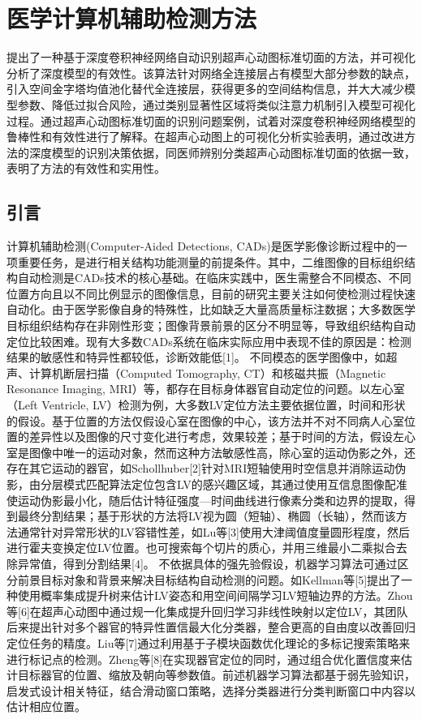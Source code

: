 \chapter{医学计算机辅助检测方法}
\label{chap:Detection}

 提出了一种基于深度卷积神经网络自动识别超声心动图标准切面的方法，并可视化分析了深度模型的有效性。该算法针对网络全连接层占有模型大部分参数的缺点，引入空间金字塔均值池化替代全连接层，获得更多的空间结构信息，并大大减少模型参数、降低过拟合风险，通过类别显著性区域将类似注意力机制引入模型可视化过程。通过超声心动图标准切面的识别问题案例，试着对深度卷积神经网络模型的鲁棒性和有效性进行了解释。在超声心动图上的可视化分析实验表明，通过改进方法的深度模型的识别决策依据，同医师辨别分类超声心动图标准切面的依据一致，表明了方法的有效性和实用性。

\section{引言}
计算机辅助检测(Computer-Aided Detections, CADs)是医学影像诊断过程中的一项重要任务，是进行相关结构功能测量的前提条件。其中，二维图像的目标组织结构自动检测是CADs技术的核心基础。在临床实践中，医生需整合不同模态、不同位置方向且以不同比例显示的图像信息，目前的研究主要关注如何使检测过程快速自动化。由于医学影像自身的特殊性，比如缺乏大量高质量标注数据；大多数医学目标组织结构存在非刚性形变；图像背景前景的区分不明显等，导致组织结构自动定位比较困难。现有大多数CADs系统在临床实际应用中表现不佳的原因是：检测结果的敏感性和特异性都较低，诊断效能低[1]。
不同模态的医学图像中，如超声、计算机断层扫描（Computed Tomography, CT）和核磁共振（Magnetic Resonance Imaging, MRI）等，都存在目标身体器官自动定位的问题。以左心室（Left Ventricle, LV）检测为例，大多数LV定位方法主要依据位置，时间和形状的假设。基于位置的方法仅假设心室在图像的中心，该方法并不对不同病人心室位置的差异性以及图像的尺寸变化进行考虑，效果较差；基于时间的方法，假设左心室是图像中唯一的运动对象，然而这种方法敏感性高，除心室的运动伪影之外，还存在其它运动的器官，如Schollhuber[2]针对MRI短轴使用时空信息并消除运动伪影，由分层模式匹配算法定位包含LV的感兴趣区域，其通过使用互信息图像配准使运动伪影最小化，随后估计特征强度—时间曲线进行像素分类和边界的提取，得到最终分割结果；基于形状的方法将LV视为圆（短轴）、椭圆（长轴），然而该方法通常针对异常形状的LV容错性差，如Lu等[3]使用大津阈值度量圆形程度，然后进行霍夫变换定位LV位置。也可搜索每个切片的质心，并用三维最小二乘拟合去除异常值，得到分割结果[4]。
不依据具体的强先验假设，机器学习算法可通过区分前景目标对象和背景来解决目标结构自动检测的问题。如Kellman等[5]提出了一种使用概率集成提升树来估计LV姿态和用空间间隔学习LV短轴边界的方法。Zhou等[6]在超声心动图中通过规一化集成提升回归学习非线性映射以定位LV，其团队后来提出针对多个器官的特异性置信最大化分类器，整合更高的自由度以改善回归定位任务的精度。Liu等[7]通过利用基于子模块函数优化理论的多标记搜索策略来进行标记点的检测。Zheng等[8]在实现器官定位的同时，通过组合优化置信度来估计目标器官的位置、缩放及朝向等参数值。前述机器学习算法都基于弱先验知识，启发式设计相关特征，结合滑动窗口策略，选择分类器进行分类判断窗口中内容以估计相应位置。
